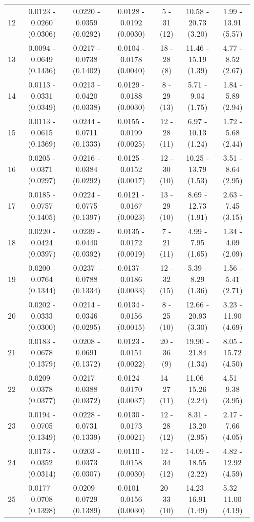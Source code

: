 \begin{table}[ht]
{\begin{tabular}{ccccccc}
            12 & 0.0123 - 0.0260 (0.0306) & 0.0220 - 0.0359 (0.0292) & 0.0128 - 0.0192 (0.0030) & 5 - 31 (12) & 10.58 - 20.73 (3.20) & 1.99 - 13.91 (5.57) \\
            13 & 0.0094 - 0.0649 (0.1436) & 0.0217 - 0.0738 (0.1402) & 0.0104 - 0.0178 (0.0040) & 18 - 28 (8) & 11.46 - 15.19 (1.39) & 4.77 - 8.52 (2.67) \\
            14 & 0.0113 - 0.0331 (0.0349) & 0.0213 - 0.0420 (0.0338) & 0.0129 - 0.0188 (0.0030) & 8 - 29 (13) & 5.71 - 9.04 (1.75) & 1.84 - 5.89 (2.94) \\
            15 & 0.0113 - 0.0615 (0.1369) & 0.0244 - 0.0711 (0.1333) & 0.0155 - 0.0199 (0.0025) & 12 - 28 (11) & 6.97 - 10.13 (1.24) & 1.72 - 5.68 (2.44) \\
            16 & 0.0205 - 0.0371 (0.0297) & 0.0216 - 0.0384 (0.0292) & 0.0125 - 0.0152 (0.0017) & 12 - 30 (10) & 10.25 - 13.79 (1.53) & 3.51 - 8.64 (2.95) \\
            17 & 0.0185 - 0.0757 (0.1405) & 0.0224 - 0.0775 (0.1397) & 0.0121 - 0.0167 (0.0023) & 13 - 29 (10) & 8.69 - 12.73 (1.91) & 2.63 - 7.45 (3.15) \\
            18 & 0.0220 - 0.0424 (0.0397) & 0.0239 - 0.0440 (0.0392) & 0.0135 - 0.0172 (0.0019) & 7 - 21 (11) & 4.99 - 7.95 (1.65) & 1.34 - 4.09 (2.09) \\
            19 & 0.0200 - 0.0764 (0.1344) & 0.0237 - 0.0788 (0.1334) & 0.0137 - 0.0186 (0.0033) & 12 - 32 (15) & 5.39 - 8.29 (1.36) & 1.56 - 5.41 (2.71) \\
            20 & 0.0202 - 0.0333 (0.0300) & 0.0214 - 0.0346 (0.0295) & 0.0134 - 0.0156 (0.0015) & 8 - 25 (10) & 12.66 - 20.93 (3.30) & 3.23 - 11.90 (4.69) \\
            21 & 0.0183 - 0.0678 (0.1379) & 0.0208 - 0.0691 (0.1372) & 0.0123 - 0.0151 (0.0022) & 20 - 36 (9) & 19.90 - 21.84 (1.34) & 8.05 - 15.72 (4.50) \\
            22 & 0.0209 - 0.0378 (0.0377) & 0.0217 - 0.0388 (0.0372) & 0.0124 - 0.0170 (0.0037) & 14 - 27 (11) & 11.06 - 15.26 (2.24) & 4.51 - 9.38 (3.95) \\
            23 & 0.0194 - 0.0705 (0.1349) & 0.0228 - 0.0731 (0.1339) & 0.0130 - 0.0173 (0.0021) & 12 - 28 (12) & 8.31 - 13.20 (2.95) & 2.17 - 7.66 (4.05) \\
            24 & 0.0173 - 0.0352 (0.0314) & 0.0203 - 0.0373 (0.0307) & 0.0110 - 0.0158 (0.0030) & 12 - 34 (12) & 14.09 - 18.55 (2.22) & 4.82 - 12.92 (4.59) \\
            25 & 0.0177 - 0.0708 (0.1398) & 0.0209 - 0.0729 (0.1389) & 0.0101 - 0.0156 (0.0030) & 20 - 33 (10) & 14.23 - 16.91 (1.49) & 5.32 - 11.00 (4.19) \\

\end{tabular}}
\end{table}
